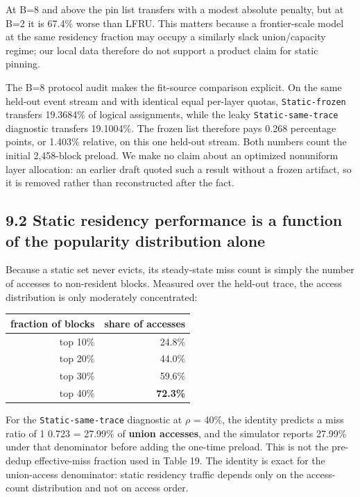\documentclass[
  10pt,
  letterpaper,
  10pt]{article}
\newcounter{none} %
\begin{document}
At B=8 and above the pin list transfers with a modest absolute penalty,
but at B=2 it is 67.4\% worse than LFRU. This matters because a
frontier-scale model at the same residency fraction may occupy a
similarly slack union/capacity regime; our local data therefore do not
support a product claim for static pinning.

The B=8 protocol audit makes the fit-source comparison explicit. On the
same held-out event stream and with identical equal per-layer quotas,
\texttt{Static-frozen} transfers 19.3684\% of logical assignments, while
the leaky \texttt{Static-same-trace} diagnostic transfers 19.1004\%. The
frozen list therefore pays 0.268 percentage points, or 1.403\% relative,
on this one held-out stream. Both numbers count the initial 2,458-block
preload. We make no claim about an optimized nonuniform layer
allocation: an earlier draft quoted such a result without a frozen
artifact, so it is removed rather than reconstructed after the fact.

\subsection{9.2 Static residency performance is a function of the
popularity distribution
alone}\label{static-residency-performance-is-a-function-of-the-popularity-distribution-alone}

Because a static set never evicts, its steady-state miss count is simply
the number of accesses to non-resident blocks. Measured over the
held-out trace, the access distribution is only moderately concentrated:

{\def\LTcaptype{none} %
\begin{longtable}[]{@{}rr@{}}
\toprule\noalign{}
fraction of blocks & share of accesses \\
\midrule\noalign{}
\endhead
\bottomrule\noalign{}
\endlastfoot
top 10\% & 24.8\% \\
top 20\% & 44.0\% \\
top 30\% & 59.6\% \\
top 40\% & \textbf{72.3\%} \\
\end{longtable}
}

For the \texttt{Static-same-trace} diagnostic at \ensuremath{\rho} =
40\%, the identity predicts a miss ratio of 1 \textminus{} 0.723 =
27.99\% of \textbf{union accesses}, and the simulator reports 27.99\%
under that denominator before adding the one-time preload. This is not
the pre-dedup effective-miss fraction used in Table 19. The identity is
exact for the union-access denominator: static residency traffic depends
only on the access-count distribution and not on access order.
\end{document}
